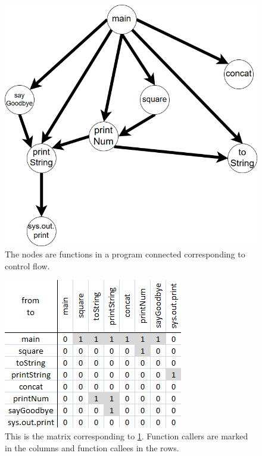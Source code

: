 \begin{figure}[tp]
  \centering
  \includegraphics[keepaspectratio,width=\hsize,height=\halfh]
  {images/Reordering_Example_graph.png}

  \caption[Directed Graph of Sample Data]{
  The nodes are functions in a program connected corresponding to control flow.
  }
  \label{fig:reordering_example_graph}
\end{figure}

\begin{figure}[tp]
  \centering
  \includegraphics[scale=0.9]
  {images/Reordering_Example_matrix.png}
  
  \caption[Matrix Representation of Sample Data]{
  This is the matrix corresponding to \ref{fig:reordering_example_graph}. Function callers are marked in the columns and function callees in the rows.
  }
  \label{fig:reordering_example_matrix}
\end{figure}

